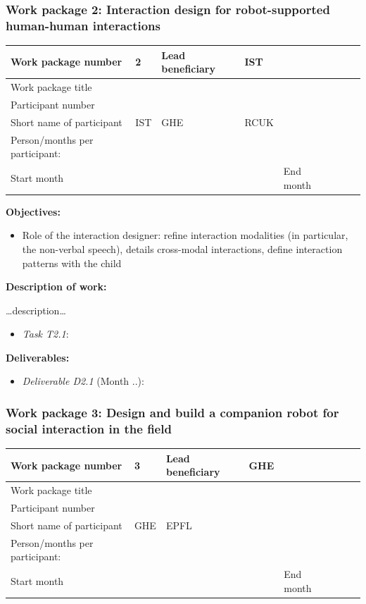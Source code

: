 \documentclass[]{article}
\begin{document}
\subsubsection{Work package 2: Interaction design for robot-supported
human-human interactions}\label{work-package-2-interaction-design-for-robot-supported-human-human-interactions}

\begin{longtable}[]{@{}llllllll@{}}
\toprule
Work package number & 2 & Lead beneficiary & IST & & & &\tabularnewline
\midrule
\endhead
Work package title & & & & & & &\tabularnewline
Participant number & & & & & & &\tabularnewline
Short name of participant & IST & GHE & RCUK & & & &\tabularnewline
Person/months per participant: & & & & & & &\tabularnewline
Start month & & & & End month & & &\tabularnewline
\bottomrule
\end{longtable}

\textbf{Objectives:}

\begin{itemize}

\item
  Role of the interaction designer: refine interaction modalities (in
  particular, the non-verbal speech), details cross-modal interactions,
  define interaction patterns with the child
\end{itemize}

\textbf{Description of work:}

\ldots{}description\ldots{}

\begin{itemize}

\item
  \emph{Task T2.1}:
\end{itemize}

\textbf{Deliverables:}

\begin{itemize}

\item
  \emph{Deliverable D2.1} (Month ..):
\end{itemize}

\subsubsection{Work package 3: Design and build a companion robot for
social interaction in the field}\label{work-package-3-design-and-build-a-companion-robot-for-social-interaction-in-the-field}

\begin{longtable}[]{@{}llllllll@{}}
\toprule
Work package number & 3 & Lead beneficiary & GHE & & & &\tabularnewline
\midrule
\endhead
Work package title & & & & & & &\tabularnewline
Participant number & & & & & & &\tabularnewline
Short name of participant & GHE & EPFL & & & & &\tabularnewline
Person/months per participant: & & & & & & &\tabularnewline
Start month & & & & End month & & &\tabularnewline
\bottomrule
\end{longtable}
\end{document}
